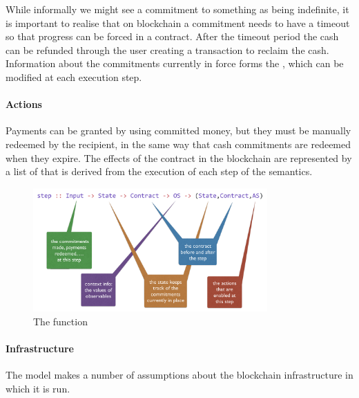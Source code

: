 \documentclass[runningheads]{llncs}
\begin{document}


While informally we might see a commitment to something as being indefinite, it is important to realise that on 
blockchain a commitment needs to have a timeout so that progress can be forced in a contract. After the timeout period the 
cash can be refunded through the user creating a transaction to reclaim the cash.
Information about the commitments currently in force forms the , which can be  modified 
at each execution step. 

\paragraph{Actions}

Payments can be granted by using committed money, but they must be manually redeemed by the recipient, in the 
same way that cash commitments are redeemed when they expire. The effects of the contract in the blockchain are 
represented by a list  of  that is derived from the execution of each step of 
the semantics.

\begin{figure}[t]
\begin{center}
\includegraphics[width=0.8\textwidth]{pix/step-type.png}
\caption{The  function}
\label{fig:step-function}
\end{center}
\vspace*{-8mm}
\end{figure}

\paragraph{Infrastructure}

The model makes a number of assumptions about the blockchain infrastructure in which it is run.
\end{document}
